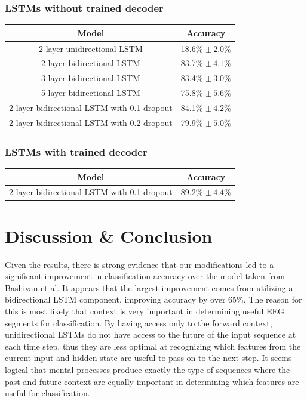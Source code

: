 \documentclass{article}
\begin{document}
\subsubsection{LSTMs without trained decoder}
\begin{center}
\begin{tabular}{ c|c } 
 Model & Accuracy \\ 
 \hline
 2 layer unidirectional LSTM & 18.6\% $\pm \, 2.0\% $\\
 2 layer bidirectional LSTM & 83.7\% $\pm \, 4.1\%$ \\
 3 layer bidirectional LSTM & 83.4\% $\pm \, 3.0\%$ \\
 5 layer bidirectional LSTM & 75.8\% $\pm \, 5.6\%$ \\
 2 layer bidirectional LSTM with 0.1 dropout & 84.1\% $\pm \, 4.2\%$ \\
 2 layer bidirectional LSTM with 0.2 dropout & 79.9\% $\pm \, 5.0\%$ \\
\end{tabular}
\end{center}
\subsubsection{LSTMs with trained decoder}
\begin{center}
\begin{tabular}{ c|c } 
 Model & Accuracy \\ 
 \hline
 2 layer bidirectional LSTM with 0.1 dropout & 89.2\% $\pm \, 4.4\%$ \\
\end{tabular}
\end{center}

\section{Discussion \& Conclusion}
Given the results, there is strong evidence that our modifications led to a significant improvement in classification accuracy over the model taken from Bashivan et al. It appears that the largest improvement comes from utilizing a bidirectional LSTM component, improving accuracy by over 65\%. The reason for this is most likely that context is very important in determining useful EEG segments for classification. By having access only to the forward context, unidirectional LSTMs do not have access to the future of the input sequence at each time step, thus they are less optimal at recognizing which features from the current input and hidden state are useful to pass on to the next step. It seems logical that mental processes produce exactly the type of sequences where the past and future context are equally important in determining which features are useful for classification.
\end{document}

